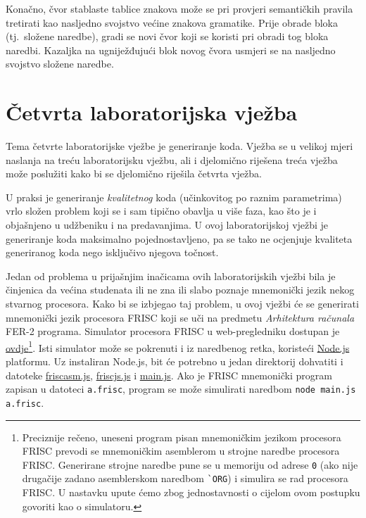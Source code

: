 \documentclass[times, 12pt, utf8]{book}
\begin{document}
Konačno, čvor stablaste tablice znakova može se pri provjeri semantičkih pravila tretirati kao nasljedno svojstvo većine znakova gramatike.
Prije obrade bloka (tj.~složene naredbe), gradi se novi čvor koji se koristi pri obradi tog bloka naredbi.
Kazaljka na ugniježđujući blok novog čvora usmjeri se na nasljedno svojstvo složene naredbe.



\chapter{Četvrta laboratorijska vježba}\label{chap:IV}
Tema četvrte laboratorijske vježbe je generiranje koda.
Vježba se u velikoj mjeri naslanja na treću laboratorijsku vježbu, ali i djelomično riješena treća vježba može poslužiti kako bi se djelomično riješila četvrta vježba.

U praksi je generiranje \emph{kvalitetnog} koda (učinkovitog po raznim parametrima) vrlo složen problem koji se i sam tipično obavlja u više faza, kao što je i objašnjeno u udžbeniku i na predavanjima.
U ovoj laboratorijskoj vježbi je generiranje koda maksimalno pojednostavljeno, pa se tako ne ocjenjuje kvaliteta generiranog koda nego isključivo njegova točnost.

Jedan od problema u prijašnjim inačicama ovih laboratorijskih vježbi bila je činjenica da većina studenata ili ne zna ili slabo poznaje mnemonički jezik nekog stvarnog procesora.
Kako bi se izbjegao taj problem, u ovoj vježbi će se generirati mnemonički jezik procesora FRISC koji se uči na predmetu \emph{Arhitektura računala} FER-2 programa.
Simulator procesora FRISC u web-pregledniku dostupan je \href{http://fer-ppj.github.com/FRISCjs/main.html}{ovdje}\footnote{Preciznije rečeno, uneseni program pisan mnemoničkim jezikom procesora FRISC prevodi se mnemoničkim asemblerom u strojne naredbe procesora FRISC. Generirane strojne naredbe pune se u memoriju od adrese \texttt{0} (ako nije drugačije zadano asemblerskom naredbom \texttt{\`{}ORG}) i simulira se rad procesora FRISC. U nastavku upute ćemo zbog jednostavnosti o cijelom ovom postupku govoriti kao o simulatoru.}.
Isti simulator može se pokrenuti i iz naredbenog retka, koristeći \href{http://nodejs.org}{Node.js} platformu.
Uz instaliran Node.js, bit će potrebno u jedan direktorij dohvatiti i datoteke \href{https://github.com/fer-ppj/FRISCjs/raw/master/friscasm.js}{friscasm.js}, \href{https://github.com/fer-ppj/FRISCjs/raw/master/friscjs.js}{friscjs.js} i \href{https://github.com/fer-ppj/FRISCjs/raw/master/main.js}{main.js}.
Ako je FRISC mnemonički program zapisan u datoteci \verb|a.frisc|, program se može simulirati naredbom \verb|node main.js a.frisc|.
\end{document}
